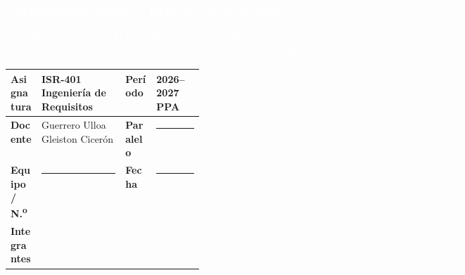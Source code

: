 \documentclass[10pt]{article}
\begin{document}
\begin{tcolorbox}[colback=uteqverde,colframe=uteqverde,sharp corners,boxrule=0pt,
  left=10pt,right=10pt,top=8pt,bottom=8pt]
  \begin{center}
    {\large\textbf{\textcolor{white}{UNIVERSIDAD T\'ECNICA ESTATAL DE QUEVEDO}}}\\[2pt]
    {\small\textcolor{white}{Facultad de Ciencias de la Computaci\'on y Dise\~no Digital — Carrera de Ingenier\'ia en Software}}\\[6pt]
    {\Large\textbf{\textcolor{white}{R\'UBRICA DE EVALUACI\'ON — EXPOSICI\'ON}}}\\[3pt]
    {\normalsize\textcolor{white}{«Herramientas Automatizadas para la Ingenier\'ia de Requisitos» (Herramientas CASE — Segundo Corte)}}
  \end{center}
\end{tcolorbox}

\vspace{4pt}

\noindent\begin{tabularx}{\linewidth}{|L{0.16\linewidth}|X|L{0.16\linewidth}|X|}
\hline
{}\textbf{Asignatura} & ISR-401 Ingenier\'ia de Requisitos &
\textbf{Per\'iodo} & 2026--2027 PPA \\
\hline
{}\textbf{Docente} & Guerrero Ulloa Gleiston Cicer\'on &
\textbf{Paralelo} & \rule{2.5cm}{0.4pt} \\
\hline
{}\textbf{Equipo / N.\textsuperscript{o}} & \rule{4cm}{0.4pt} &
\textbf{Fecha} & \rule{2.5cm}{0.4pt} \\
\hline
{}\textbf{Integrantes} &  \\
\hline
\end{tabularx}

\vspace{8pt}
\end{document}
